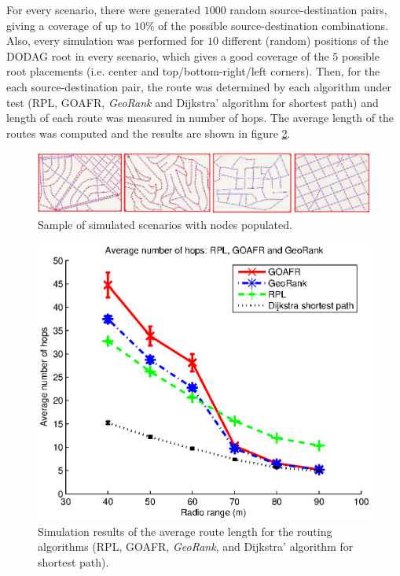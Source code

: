 \documentclass[authoryear,preprint,review,12pt]{elsarticle}
\begin{document}
For every scenario, there were generated $1000$ random source-destination pairs, giving a coverage of up to $10$\% of the possible source-destination combinations. Also, every simulation was performed for $10$ different (random) positions of the DODAG root in every scenario, which gives a good coverage of the $5$ possible root placements (i.e. center and top/bottom-right/left corners). Then, for the each source-destination pair, the route was determined by each algorithm under test (RPL, GOAFR, \textit{GeoRank} and Dijkstra' algorithm for shortest path) and length of each route was measured in number of hops. The average length of the routes was computed and the results are shown in figure \ref{sim_results}. 
  
\begin{figure}
\centering
\includegraphics[width=1\textwidth]{figures/sample_scenarios.eps}
\caption{Sample of simulated scenarios with nodes populated.}
\label{sim_scenarios}
\end{figure}


\begin{figure}
\centering
\includegraphics[width=1\textwidth]{figures/hops_range.eps}
\caption{Simulation results of the average route length for the routing algorithms (RPL, GOAFR, \textit{GeoRank}, and Dijkstra' algorithm for shortest path).}
\label{sim_results}
\end{figure}
\end{document}
